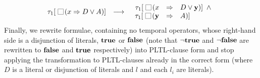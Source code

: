 \documentclass[nohyperref]{acmtrans2f}
\newcommand{\always}{\raisebox{-.2ex}{
                           \mbox{\unitlength=0.9ex
                           \begin{picture}(2,2)
                           \linethickness{0.06ex}
                           \put(0,0){\line(1,0){2}}
                           \put(0,2){\line(1,0){2}}
                           \put(0,0){\line(0,1){2}}
                           \put(2,0){\line(0,1){2}}
                           \end{picture}}}
                          \,}
\let\imp=\Rightarrow
\def\ltrue{\hbox{\rm\bf true}}
\def\lfalse{\hbox{\rm\bf false}}
\begin{document}
$$
\begin{array}{rcll}
\tau_1[\always(x \imp D \lor A )]
 & \longrightarrow  &
\begin{array}{rcl} 
\tau_1[\always(x & \imp & D \lor {\bf y})] \ \,\land \\
\tau_1[\always({\bf y} & \imp & A)]
\end{array} \\
\end{array}
$$
Finally, we rewrite formulae, containing no temporal operators, whose
right-hand side is a disjunction of literals, $\ltrue$ or $\lfalse$
(note that $\neg \ltrue$ and $\neg \lfalse$ are rewritten to $\lfalse$
and $\ltrue$ respectively) into PLTL-clause form and stop applying the
transformation to PLTL-clauses already in the correct form (where
$D$ is a literal or disjunction of literals and $l$ and each $l_i$ are
literals). 
\end{document}
